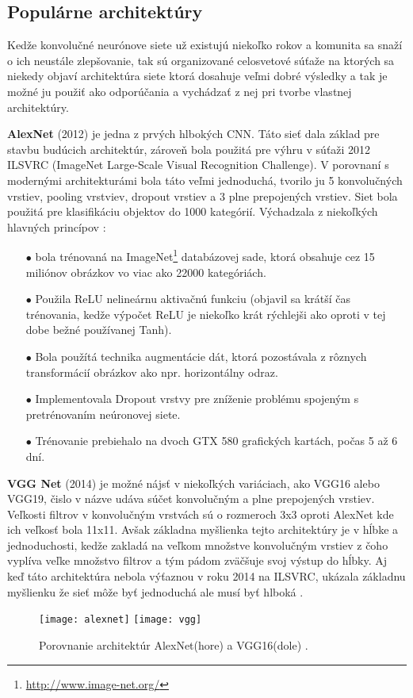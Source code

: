 \subsection{Populárne architektúry}
\label{subsec:popularCNN}
Kedže konvolučné neurónove siete už existujú niekoľko rokov a komunita sa snaží o ich neustále zlepšovanie, tak sú organizované
    celosvetové súťaže na ktorých sa niekedy objaví architektúra siete ktorá dosahuje veľmi dobré výsledky a tak je možné ju použiť ako odporúčania a
    vychádzať z nej pri tvorbe vlastnej architektúry.

\textbf{AlexNet} (2012) je jedna z prvých hlbokých CNN. Táto sieť dala základ pre stavbu budúcich architektúr, zároveň bola použitá
    pre výhru v súťaži 2012 ILSVRC (ImageNet Large-Scale Visual Recognition Challenge).
V porovnaní s modernými architekturámi bola táto veľmi jednoduchá, tvorilo ju 5 konvolučných vrstiev, pooling vrstviev, dropout vrstiev a 3 plne prepojených vrstiev.
Siet bola použitá pre klasifikáciu objektov do 1000 kategórií.
Výchadzala z niekoľkých hlavných princípov \cite{odkaz:PopularCNN}:
\begin{enumerate}
    \item[$\bullet$] bola trénovaná na ImageNet\footnote{\url{http://www.image-net.org/}} databázovej sade, ktorá obsahuje cez 15 miliónov obrázkov vo viac ako 22000 kategóriách.
    \item[$\bullet$] Použila ReLU nelineárnu aktivačnú funkciu (objavil sa krátší čas trénovania, kedže výpočet ReLU je niekoľko krát rýchlejši ako oproti v tej dobe bežné používanej Tanh).
    \item[$\bullet$] Bola použítá technika augmentácie dát, ktorá pozostávala z rôznych transformácií obrázkov ako npr. horizontálny odraz.
    \item[$\bullet$] Implementovala Dropout vrstvy pre zníženie problému spojeným s pretrénovaním neúronovej siete.
    \item[$\bullet$] Trénovanie prebiehalo na dvoch GTX 580 grafických kartách, počas 5 až 6 dní.
\end{enumerate}

\textbf{VGG Net} (2014) je možné nájsť v niekoľkých variáciach, ako VGG16 alebo VGG19, čislo v názve udáva súčet konvolučným a plne prepojených vrstiev.
Veľkosti filtrov v konvolučným vrstvách sú o rozmeroch 3x3 oproti AlexNet kde ich veľkosť bola 11x11.
Avšak základna myšlienka tejto architektúry je v hĺbke a jednoduchosti, kedže zakladá na veľkom množstve konvolučným vrstiev z čoho vyplíva
    veľke množstvo filtrov a tým pádom zväčšuje svoj výstup do hĺbky.
Aj keď táto architektúra nebola výťaznou v roku 2014 na ILSVRC, ukázala základnu myšlienku že sieť môže byť jednoduchá ale musí byť hlboká \cite{odkaz:PopularCNN}.

\begin{figure}[H]
    \centering
    \texttt{[image: alexnet]}
    \qquad
    \texttt{[image: vgg]}
    \caption{Porovnanie architektúr AlexNet(hore) \cite{odkaz:AlexNet} a VGG16(dole) \cite{odkaz:VGG16}.}
    \label{pic:PopularCNN}
\end{figure}
